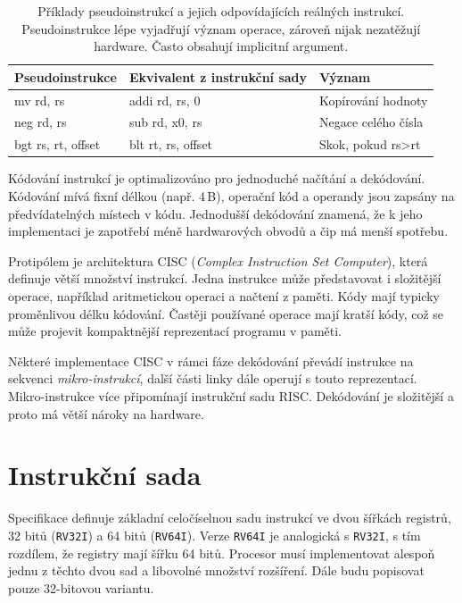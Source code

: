 \begin{table}[ht]
\centering
\caption{Příklady pseudoinstrukcí a jejich odpovídajících reálných instrukcí. Pseudoinstrukce lépe vyjadřují význam operace, zároveň nijak nezatěžují hardware. Často obsahují implicitní argument.}
\begin{tabular}{|l|l|l|}
\hline
Pseudoinstrukce    & Ekvivalent z instrukční sady & Význam                         \\ \hline\hline
mv rd, rs          & addi rd, rs, 0     & Kopírování hodnoty             \\ \hline
neg rd, rs         & sub rd, x0, rs     & Negace celého čísla            \\ \hline
bgt rs, rt, offset & blt rt, rs, offset & Skok, pokud rs\textgreater{}rt \\ \hline
\end{tabular}
\label{table:pseudoins}
\end{table}

Kódování instrukcí je optimalizováno pro jednoduché načítání a dekódování.
Kódování mívá fixní délkou (např. 4\,B), operační kód a operandy jsou zapsány na předvídatelných místech v kódu.
Jednodušší dekódování znamená, že k jeho implementaci je zapotřebí méně hardwarových obvodů a čip má menší spotřebu.

Protipólem je architektura CISC (\emph{Complex Instruction Set Computer}), která definuje větší množství instrukcí.
Jedna instrukce může představovat i složitější operace, například aritmetickou operaci a načtení z paměti. Kódy mají typicky proměnlivou délku kódování.
Častěji používané operace mají kratší kódy, což se může projevit kompaktnější reprezentací programu v paměti.

Některé implementace CISC v rámci fáze dekódování převádí instrukce na sekvenci \emph{mikro-instrukcí}, další části linky dále operují s touto reprezentací.
Mikro-instrukce více připomínají instrukční sadu RISC.
Dekódování je složitější a proto má větší nároky na hardware.

\section{Instrukční sada}

Specifikace definuje základní celočíselnou sadu instrukcí ve dvou šířkách registrů, 32 bitů (\texttt{RV32I}) a 64 bitů (\texttt{RV64I}).
Verze \texttt{RV64I} je analogická s \texttt{RV32I}, s tím rozdílem, že registry mají šířku 64 bitů.
Procesor musí implementovat alespoň jednu z těchto dvou sad a libovolné množství rozšíření.
Dále budu popisovat pouze 32-bitovou variantu.

